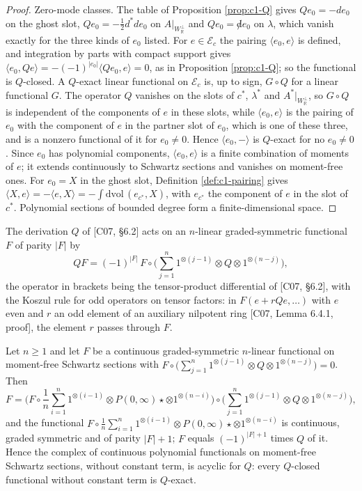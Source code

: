 \begin{proof}
Zero-mode classes. The table of Proposition \ref{prop:c1-Q} gives $Qe_0=-de_0$ on the ghost slot, $Qe_0=-\tfrac12d^*de_0$ on $A|_{W_{\mathbb R}^\perp}$ and $Qe_0={\not d}e_0$ on $\lambda$, which vanish exactly for the three kinds of $e_0$ listed. For $e\in\mathscr E_c$ the pairing $\langle e_0,e\rangle$ is defined, and integration by parts with compact support gives $\langle e_0,Qe\rangle=-(-1)^{|e_0|}\langle Qe_0,e\rangle=0$, as in Proposition \ref{prop:c1-Q}; so the functional is $Q$-closed. A $Q$-exact linear functional on $\mathscr E_c$ is, up to sign, $G\circ Q$ for a linear functional $G$. The operator $Q$ vanishes on the slots of $c^*$, $\lambda^*$ and $A^*|_{W_{\mathbb R}^\perp}$, so $G\circ Q$ is independent of the components of $e$ in these slots, while $\langle e_0,e\rangle$ is the pairing of $e_0$ with the component of $e$ in the partner slot of $e_0$, which is one of these three, and is a nonzero functional of it for $e_0\neq0$. Hence $\langle e_0,-\rangle$ is $Q$-exact for no $e_0\neq0$. Since $e_0$ has polynomial components, $\langle e_0,e\rangle$ is a finite combination of moments of $e$; it extends continuously to Schwartz sections and vanishes on moment-free ones. For $e_0=X$ in the ghost slot, Definition \ref{def:c1-pairing} gives $\langle X,e\rangle=-\langle e,X\rangle=-\int\mathrm{dvol}\,(e_{c^*},X)$, with $e_{c^*}$ the component of $e$ in the slot of $c^*$. Polynomial sections of bounded degree form a finite-dimensional space.
\end{proof}

The derivation $Q$ of [C07, §6.2] acts on an $n$-linear graded-symmetric functional $F$ of parity $|F|$ by
\[
QF=(-1)^{|F|}\,F\circ\Big(\sum_{j=1}^n1^{\otimes(j-1)}\otimes Q\otimes1^{\otimes(n-j)}\Big),
\]
the operator in brackets being the tensor-product differential of [C07, §6.2], with the Koszul rule for odd operators on tensor factors: in $F(e+rQe,\dots)$ with $e$ even and $r$ an odd element of an auxiliary nilpotent ring [C07, Lemma 6.4.1, proof], the element $r$ passes through $F$.

\begin{corollary}
\label{cor:c3-functionals}
Let $n\ge1$ and let $F$ be a continuous graded-symmetric $n$-linear functional on moment-free Schwartz sections with $F\circ\big(\sum_{j=1}^n1^{\otimes(j-1)}\otimes Q\otimes1^{\otimes(n-j)}\big)=0$. Then
\[
F=\Big(F\circ\frac1n\sum_{i=1}^n1^{\otimes(i-1)}\otimes P(0,\infty)\star\otimes1^{\otimes(n-i)}\Big)\circ\Big(\sum_{j=1}^n1^{\otimes(j-1)}\otimes Q\otimes1^{\otimes(n-j)}\Big),
\]
and the functional $F\circ\frac1n\sum_{i=1}^n1^{\otimes(i-1)}\otimes P(0,\infty)\star\otimes1^{\otimes(n-i)}$ is continuous, graded symmetric and of parity $|F|+1$; $F$ equals $(-1)^{|F|+1}$ times $Q$ of it. Hence the complex of continuous polynomial functionals on moment-free Schwartz sections, without constant term, is acyclic for $Q$: every $Q$-closed functional without constant term is $Q$-exact.
\end{corollary}

